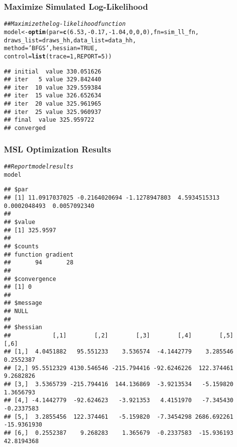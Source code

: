 \documentclass{beamer}\usepackage[]{graphicx}\usepackage[]{xcolor}
\makeatletter
\newcommand{\hlnum}[1]{\textcolor[rgb]{0.686,0.059,0.569}{#1}}%
\newcommand{\hlstr}[1]{\textcolor[rgb]{0.192,0.494,0.8}{#1}}%
\newcommand{\hlcom}[1]{\textcolor[rgb]{0.678,0.584,0.686}{\textit{#1}}}%
\newcommand{\hlopt}[1]{\textcolor[rgb]{0,0,0}{#1}}%
\newcommand{\hlstd}[1]{\textcolor[rgb]{0.345,0.345,0.345}{#1}}%
\newcommand{\hlkwb}[1]{\textcolor[rgb]{0.69,0.353,0.396}{#1}}%
\newcommand{\hlkwc}[1]{\textcolor[rgb]{0.333,0.667,0.333}{#1}}%
\newcommand{\hlkwd}[1]{\textcolor[rgb]{0.737,0.353,0.396}{\textbf{#1}}}%
\newenvironment{kframe}{%
 \def\at@end@of@kframe{}%
 \ifinner\ifhmode%
  \def\at@end@of@kframe{\end{minipage}}%
  \begin{minipage}{\columnwidth}%
 \fi\fi%
 \def\FrameCommand##1{\hskip\@totalleftmargin \hskip-\fboxsep
 \colorbox{shadecolor}{##1}\hskip-\fboxsep
     \hskip-\linewidth \hskip-\@totalleftmargin \hskip\columnwidth}%
 \MakeFramed {\advance\hsize-\width
   \@totalleftmargin\z@ \linewidth\hsize
   \@setminipage}}%
 {\par\unskip\endMakeFramed%
 \at@end@of@kframe}
\newenvironment{knitrout}{}{} %
\makeatother
\begin{document}
\begin{frame}[fragile]\frametitle{Maximize Simulated Log-Likelihood}
\begin{knitrout}\footnotesize
{}\color{fgcolor}\begin{kframe}
\begin{alltt}
\hlcom{## Maximize the log-likelihood function}
\hlstd{model} \hlkwb{<-} \hlkwd{optim}\hlstd{(}\hlkwc{par} \hlstd{=} \hlkwd{c}\hlstd{(}\hlnum{6.53}\hlstd{,} \hlopt{-}\hlnum{0.17}\hlstd{,} \hlopt{-}\hlnum{1.04}\hlstd{,} \hlnum{0}\hlstd{,} \hlnum{0}\hlstd{,} \hlnum{0}\hlstd{),} \hlkwc{fn} \hlstd{= sim_ll_fn,}
               \hlkwc{draws_list} \hlstd{= draws_hh,} \hlkwc{data_list} \hlstd{= data_hh,}
               \hlkwc{method} \hlstd{=} \hlstr{'BFGS'}\hlstd{,} \hlkwc{hessian} \hlstd{=} \hlnum{TRUE}\hlstd{,}
               \hlkwc{control} \hlstd{=} \hlkwd{list}\hlstd{(}\hlkwc{trace} \hlstd{=} \hlnum{1}\hlstd{,} \hlkwc{REPORT} \hlstd{=} \hlnum{5}\hlstd{))}
\end{alltt}
\begin{verbatim}
## initial  value 330.051626 
## iter   5 value 329.842440
## iter  10 value 329.559384
## iter  15 value 326.652634
## iter  20 value 325.961965
## iter  25 value 325.960937
## final  value 325.959722 
## converged
\end{verbatim}
\end{kframe}
\end{knitrout}
\end{frame}

\begin{frame}[fragile]\frametitle{MSL Optimization Results}
    
\begin{knitrout}\tiny
{}\color{fgcolor}\begin{kframe}
\begin{alltt}
\hlcom{## Report model results}
\hlstd{model}
\end{alltt}
\begin{verbatim}
## $par
## [1] 11.0917037025 -0.2164020694 -1.1278947803  4.5934515313  0.0002048493  0.0057092340
## 
## $value
## [1] 325.9597
## 
## $counts
## function gradient 
##       94       28 
## 
## $convergence
## [1] 0
## 
## $message
## NULL
## 
## $hessian
##            [,1]        [,2]        [,3]        [,4]        [,5]        [,6]
## [1,]  4.0451882   95.551233    3.536574  -4.1442779    3.285546   0.2552387
## [2,] 95.5512329 4130.546546 -215.794416 -92.6246226  122.374461   9.2682826
## [3,]  3.5365739 -215.794416  144.136869  -3.9213534   -5.159820   1.3656793
## [4,] -4.1442779  -92.624623   -3.921353   4.4151970   -7.345430  -0.2337583
## [5,]  3.2855456  122.374461   -5.159820  -7.3454298 2686.692261 -15.9361930
## [6,]  0.2552387    9.268283    1.365679  -0.2337583  -15.936193  42.8194368
\end{verbatim}
\end{kframe}
\end{knitrout}
\end{frame}
\end{document}
